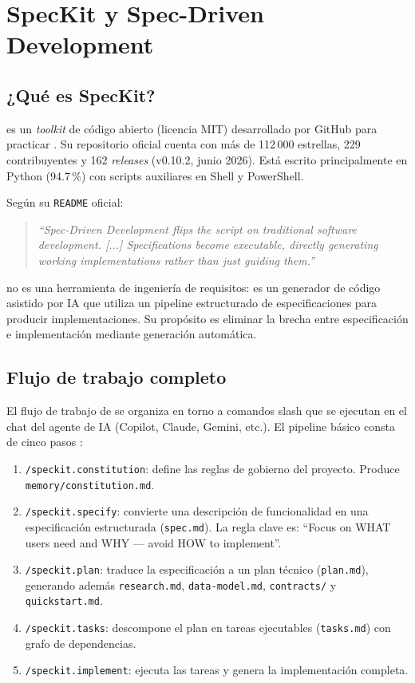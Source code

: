 \section{SpecKit y Spec-Driven Development}
\label{sec:speckit}

\subsection{¿Qu\'e es SpecKit?}

\speckit{} es un \emph{toolkit} de c\'odigo abierto (licencia MIT) desarrollado por GitHub para practicar \sdd{}. Su repositorio oficial \cite{speckit_repo} cuenta con m\'as de 112\,000 estrellas, 229 contribuyentes y 162 \emph{releases} (v0.10.2, junio 2026). Est\'a escrito principalmente en Python (94.7\,\%) con scripts auxiliares en Shell y PowerShell.

Seg\'un su \texttt{README} oficial:

\begin{quote}
\emph{``Spec-Driven Development flips the script on traditional software development. [...] Specifications become executable, directly generating working implementations rather than just guiding them.''} \cite{speckit_repo}
\end{quote}

\speckit{} no es una herramienta de ingenier\'ia de requisitos: es un generador de c\'odigo asistido por IA que utiliza un pipeline estructurado de especificaciones para producir implementaciones. Su prop\'osito es eliminar la brecha entre especificaci\'on e implementaci\'on mediante generaci\'on autom\'atica.

\subsection{Flujo de trabajo completo}

El flujo de trabajo de \speckit{} se organiza en torno a comandos slash que se ejecutan en el chat del agente de IA (Copilot, Claude, Gemini, etc.). El pipeline b\'asico consta de cinco pasos \cite{speckit_repo,speckit_sdd}:

\begin{enumerate}
    \item \texttt{/speckit.constitution}: define las reglas de gobierno del proyecto. Produce \texttt{memory/constitution.md}.
    \item \texttt{/speckit.specify}: convierte una descripci\'on de funcionalidad en una especificaci\'on estructurada (\texttt{spec.md}). La regla clave es: ``Focus on WHAT users need and WHY --- avoid HOW to implement''.
    \item \texttt{/speckit.plan}: traduce la especificaci\'on a un plan t\'ecnico (\texttt{plan.md}), generando adem\'as \texttt{research.md}, \texttt{data-model.md}, \texttt{contracts/} y \texttt{quickstart.md}.
    \item \texttt{/speckit.tasks}: descompone el plan en tareas ejecutables (\texttt{tasks.md}) con grafo de dependencias.
    \item \texttt{/speckit.implement}: ejecuta las tareas y genera la implementaci\'on completa.
\end{enumerate}

